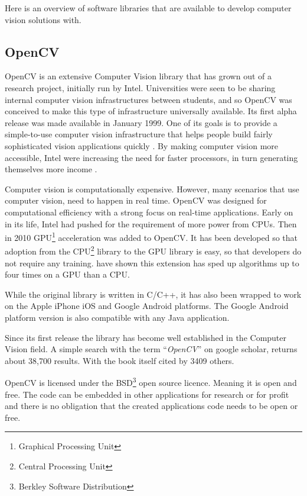\documentclass[11pt,oneside]{report}
\begin{document}
					Here is an overview of software libraries that are available to develop computer vision solutions with.
					
					\subsection{OpenCV}
						OpenCV is an extensive Computer Vision library that has grown out of a research project, initially run by Intel.
				Universities were seen to be sharing internal computer vision infrastructures between students, and so OpenCV was conceived to make this type of infrastructure universally available.
				Its first alpha release was made available in January 1999.
				One of its goals is to provide a simple-to-use computer vision infrastructure that helps people build fairly sophisticated vision applications quickly \cite[p. 1]{definition:cv}.	
				By making computer vision more accessible, Intel were increasing the need for faster processors, in turn generating themselves more income \cite{definition:cv}.
				
				Computer vision is computationally expensive.
				However, many scenarios that use computer vision, need to happen in real time.
				OpenCV was designed for computational efficiency with a strong focus on real-time applications.
				Early on in its life, Intel had pushed for the requirement of more power from CPUs.
				Then in 2010 GPU\footnote{Graphical Processing Unit} acceleration was added to OpenCV.
				It has been developed so that adoption from the CPU\footnote{Central Processing Unit} library to the GPU library is easy, so that developers do not require any training.
				 have shown this extension has sped up algorithms up to four times on a GPU than a CPU.
				
				While the original library is written in C/C++, it has also been wrapped to work on the Apple iPhone iOS and Google Android platforms.
				The Google Android platform version is also compatible with any Java application.
								
				Since its first release the library has become well established in the Computer Vision field.
				A simple search with the term ``\textit{OpenCV}'' on google scholar, returns about 38,700 results.
				With the  book itself cited by 3409 others.
				
				OpenCV is licensed under the BSD\footnote{Berkley Software Distribution} open source licence.
				Meaning it is open and free.
				The code can be embedded in other applications for research or for profit and there is no obligation that the created applications code needs to be open or free.
\end{document}

